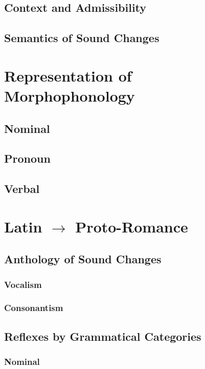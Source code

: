 \documentclass{report}
\begin{document}
\section{Context and Admissibility}

\section{Semantics of Sound Changes}

\chapter{Representation of Morphophonology}

\section{Nominal}

\section{Pronoun}

\section{Verbal}

\chapter{Latin $\rightarrow$ Proto-Romance}

\section{Anthology of Sound Changes}

\subsection{Vocalism}

\subsection{Consonantism}

\section{Reflexes by Grammatical Categories}

\subsection{Nominal}
\end{document}
